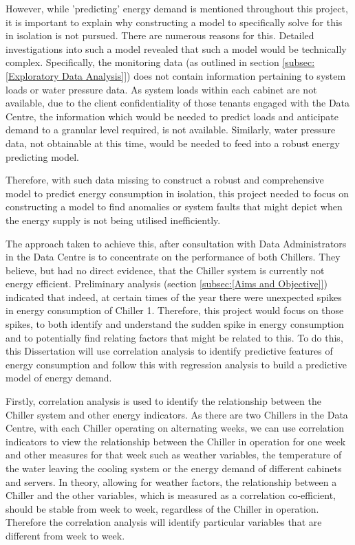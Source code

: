 \documentclass[12pt]{scrartcl}
\begin{document}
However, while 'predicting' energy demand is mentioned throughout this project, it is important to explain why constructing a model to specifically solve for this in isolation is not pursued. There are numerous reasons for this. Detailed investigations into such a model revealed that such a model would be technically complex. Specifically, the monitoring data (as outlined in section \ref{subsec:[Exploratory Data Analysis]}) does not contain information pertaining to system loads or water pressure data. As system loads within each cabinet are not available, due to the client confidentiality of those tenants engaged with the Data Centre, the information which would be needed to predict loads and anticipate demand to a granular level required, is not available. Similarly, water pressure data, not obtainable at this time, would be needed to feed into a robust energy predicting model.  

Therefore, with such data missing to construct a robust and comprehensive model to predict energy consumption in isolation, this project needed to focus on constructing a model to find anomalies or system faults that might depict when the energy supply is not being utilised inefficiently.  

The approach taken to achieve this, after consultation with Data Administrators in the Data Centre is to concentrate on the performance of both Chillers. They believe, but had no direct evidence, that the Chiller system is currently not energy efficient. Preliminary analysis (section \ref{subsec:[Aims and Objective]}) indicated that indeed, at certain times of the year there were unexpected spikes in energy consumption of Chiller 1. Therefore, this project would focus on those spikes, to both identify and understand the sudden spike in energy consumption and to potentially find relating factors that might be related to this. To do this, this Dissertation will use correlation analysis to identify predictive features of energy consumption and follow this with regression analysis to build a predictive model of energy demand.

 

Firstly, correlation analysis is used to identify the relationship between the Chiller system and other energy indicators. As there are two Chillers in the Data Centre, with each Chiller operating on alternating weeks, we can use correlation indicators to view the relationship between the Chiller in operation for one week and other measures for that week such as weather variables, the temperature of the water leaving the cooling system or the energy demand of different cabinets and servers. In theory, allowing for weather factors, the relationship between a Chiller and the other variables, which is measured as a correlation co-efficient, should be stable from week to week, regardless of the Chiller in operation. Therefore the correlation analysis will identify particular variables that are different from week to week.
\end{document}
